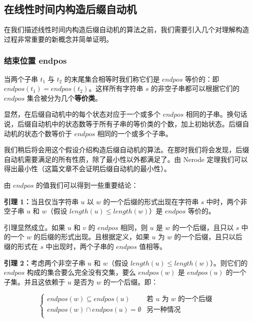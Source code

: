 \subsection{在线性时间内构造后缀自动机}

在我们描述线性时间内构造后缀自动机的算法之前，我们需要引入几个对理解构造过程非常重要的新概念并简单证明。

\subsubsection{结束位置 endpos}



当两个子串 $t_1$ 与 $t_2$ 的末尾集合相等时我们称它们是 $endpos$ 等价的：即 $endpos(t_1)=endpos(t_2)$。这样所有字符串 $s$ 的非空子串都可以根据它们的 \textbf{$endpos$} 集合被分为几个\textbf{等价类}。

显然，在后缀自动机中的每个状态对应于一个或多个 $endpos$ 相同的子串。换句话说，后缀自动机中的状态数等于所有子串的等价类的个数，加上初始状态。后缀自动机的状态个数等价于 $endpos$ 相同的一个或多个子串。

我们稍后将会用这个假设介绍构造后缀自动机的算法。在那时我们将会发现，后缀自动机需要满足的所有性质，除了最小性以外都满足了。由 Nerode 定理我们可以得出最小性（这篇文章不会证明后缀自动机的最小性）。

由 $endpos$ 的值我们可以得到一些重要结论：

\begin{QUOTE}{}{}
\textbf{引理 1：}当且仅当字符串 $u$ 以 $w$ 的一个后缀的形式出现在字符串 $s$ 中时，两个非空子串 $u$ 和 $w$（假设 $length(u)\le length(w)$）是 $endpos$ 等价的。
\end{QUOTE}

引理显然成立。如果 $u$ 和 $v$ 的 $endpos$ 相同，则 $u$ 是 $w$ 的一个后缀，且只以 $s$ 中的一个 $w$ 的后缀的形式出现。且根据定义，如果 $u$ 为 $w$ 的一个后缀，且只以后缀的形式在 $s$ 中出现时，两个子串的 $endpos$ 值相等。

\begin{QUOTE}{}{}
\textbf{引理 2：}考虑两个非空子串 $u$ 和 $w$（假设 $length(u)\le length(w)$）。则它们的 $endpos$ 构成的集合要么完全没有交集，要么 $endpos(w)$ 是 $endpos(u)$ 的一个子集。并且这依赖于 $u$ 是否为 $w$ 的一个后缀。即：



$$

\begin{cases}

 endpos(w)\subseteq endpos(u)&\text{若 $u$ 为 $w$ 的一个后缀}\\

 endpos(w)\cap endpos(u)=\emptyset&\text{另一种情况}\\

\end{cases}

$$
\end{QUOTE}

